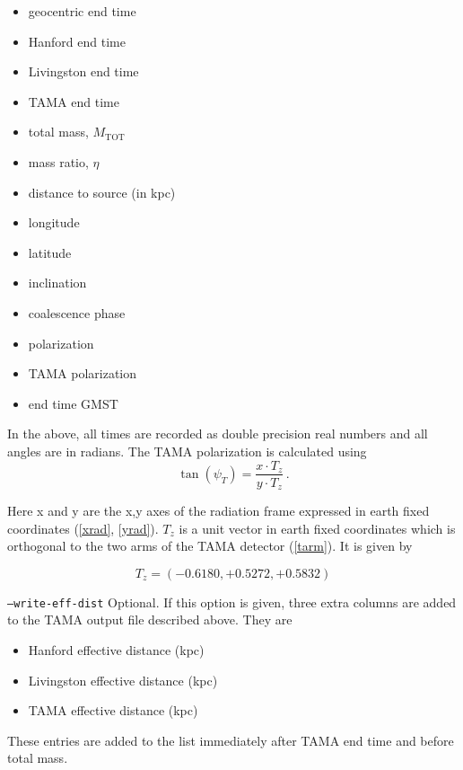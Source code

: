 \begin{entry}
\begin{entry}
\begin{itemize}
\item geocentric end time
\item Hanford end time
\item Livingston end time
\item TAMA end time
\item total mass, $M_{\mathrm{TOT}}$
\item mass ratio, $\eta$
\item distance to source (in kpc)
\item longitude
\item latitude
\item inclination
\item coalescence phase
\item polarization
\item TAMA polarization
\item end time GMST
\end{itemize}

In the above, all times are recorded as double precision real numbers and all
angles are in radians.  The TAMA polarization is calculated using
%
\begin{equation}
  \tan( \psi_{T} ) = \frac{ x \cdot T_{z} }{ y \cdot T_{z} } \, .
\end{equation}
%

Here x and y are the x,y axes of the radiation frame expressed in earth fixed
coordinates (\ref{xrad}, \ref{yrad}).  $T_{z}$ is a unit vector in earth fixed
coordinates which is orthogonal to the two arms of the TAMA detector
(\ref{tarm}).  It is given by

%
\begin{equation}
  T_{z} = ( -0.6180, +0.5272, +0.5832 )
\end{equation}
%

\item[\texttt{--write-eff-dist}] Optional.  If this option is given, three extra
columns are added to the TAMA output file described above.  They are
\begin{itemize}
\item Hanford effective distance (kpc)
\item Livingston effective distance (kpc)
\item TAMA effective distance (kpc)
\end{itemize}
  
These entries are added to the list immediately after TAMA end time and before
total mass.


\end{entry}
\end{entry}
